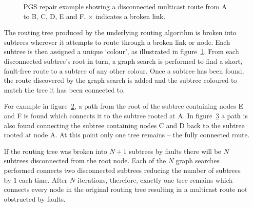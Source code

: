 		\begin{figure}
			\center
			\begin{subfigure}{0.32\linewidth}
				\hspace*{-1.5em}
				
				\caption{}
				\label{fig:pgs-repair-colouring}
			\end{subfigure}
			\begin{subfigure}{0.32\linewidth}
				\hspace*{-1.5em}
				
				\caption{}
				\label{fig:pgs-repair-colouring-fix1}
			\end{subfigure}
			\begin{subfigure}{0.32\linewidth}
				\hspace*{-1.5em}
				
				\caption{}
				\label{fig:pgs-repair-colouring-fix2}
			\end{subfigure}
			
			\caption[PGS repair example.]%
			{PGS repair example showing a disconnected multicast route from A
			to B, C, D, E and F. {\color{red}$\times$} indicates a broken link.}
			\label{fig:pgs-repair-colouring-steps}
		\end{figure}
		
		The routing tree produced by the underlying routing algorithm is broken
		into subtrees wherever it attempts to route through a broken link or node.
		Each subtree is then assigned a unique `colour', as illustrated in
		figure~\ref{fig:pgs-repair-colouring}. From each disconnected subtree's
		root in turn, a graph search is performed to find a short, fault-free route
		to a subtree of any other colour. Once a subtree has been found, the route
		discovered by the graph search is added and the subtree coloured to match
		the tree it has been connected to.
		
		For example in figure~\ref{fig:pgs-repair-colouring-fix1}, a path from the
		root of the subtree containing nodes E and F is found which connects it to
		the subtree rooted at A. In figure~\ref{fig:pgs-repair-colouring-fix2} a
		path is also found connecting the subtree containing nodes C and D back to
		the subtree rooted at node A. At this point only one tree remains -- the
		fully connected route.
		
		If the routing tree was broken into $N+1$ subtrees by faults there will be
		$N$ subtrees disconnected from the root node. Each of the $N$ graph
		searches performed connects two disconnected subtrees reducing the number
		of subtrees by $1$ each time. After $N$ iterations, therefore, exactly one
		tree remains which connects every node in the original routing tree
		resulting in a multicast route not obstructed by faults.
		
